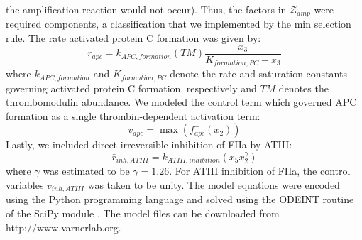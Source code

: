 \documentclass[12pt]{article}
\begin{document}
the amplification reaction would not occur). Thus, the factors in $\mathcal{Z}_{amp}$ were required components, a classification
that we implemented by the min selection rule.
The rate activated protein C formation was given by:
\begin{equation}
	\bar{r}_{apc} = k_{APC,formation}\left(TM\right)\frac{x_{3}}{K_{formation,PC} + x_{3}}
\end{equation}where $k_{APC,formation}$ and $K_{formation,PC}$ denote the rate and saturation constants governing activated protein C formation, respectively and $TM$ denotes
the thrombomodulin abundance. We modeled the control term which governed APC formation as a single thrombin-dependent activation term:
\begin{equation}
	v_{apc} = \max\left(f_{apc}^{+}\left(x_{2}\right)\right)
\end{equation}
Lastly, we included direct irreversible inhibition of FIIa by ATIII:
\begin{equation}
	\bar{r}_{inh,ATIII} = k_{ATIII,inhibition}\left(x_{5}x_{2}^{\gamma}\right)
\end{equation}where $\gamma$ was estimated to be $\gamma = 1.26$. For ATIII inhibition of FIIa, the control variables $v_{inh,ATIII}$ was taken to be unity.
The model equations were encoded using the Python programming language and solved using the ODEINT routine of the SciPy module \citep{SCIPY}.
The model files can be downloaded from http://www.varnerlab.org.
\end{document}

